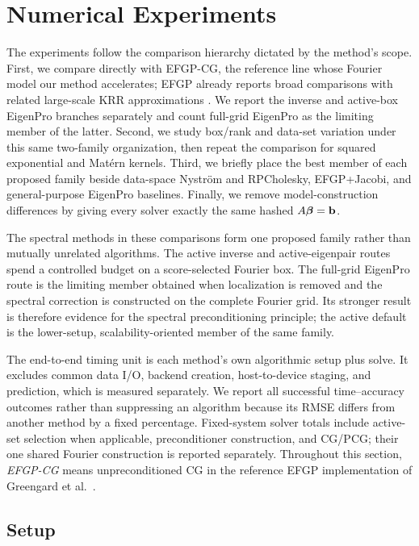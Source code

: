 \section{Numerical Experiments}
\label{sec:experiments}

The experiments follow the comparison hierarchy dictated by the method's
scope.  First, we compare directly with EFGP-CG, the reference line whose
Fourier model our method accelerates; EFGP already reports broad comparisons
with related large-scale KRR approximations \cite{greengard2025efgp}.  We
report the inverse and active-box EigenPro branches separately and count
full-grid EigenPro as the limiting member of the latter.  Second, we study
box/rank and data-set variation under this same two-family organization, then
repeat the comparison for squared exponential and Mat\'ern kernels.  Third,
we briefly place the best member of each proposed family beside data-space
Nystr\"om and RPCholesky, EFGP+Jacobi, and general-purpose EigenPro baselines.
Finally, we remove model-construction differences by giving every solver
exactly the same hashed \(A\boldsymbol\beta=\mathbf b\).

The spectral methods in these comparisons form one proposed family rather
than mutually unrelated algorithms.  The active inverse and active-eigenpair
routes spend a controlled budget on a score-selected Fourier box.  The
full-grid EigenPro route is the limiting member obtained when localization is
removed and the spectral correction is constructed on the complete Fourier
grid.  Its stronger result is therefore evidence for the spectral
preconditioning principle; the active default is the lower-setup,
scalability-oriented member of the same family.

The end-to-end timing unit is each method's own algorithmic setup plus solve.
It excludes common data I/O, backend creation, host-to-device staging, and
prediction, which is measured separately.  We report all successful
time--accuracy outcomes rather than suppressing an algorithm because its RMSE
differs from another method by a fixed percentage.  Fixed-system solver totals
include active-set selection when applicable, preconditioner construction,
and CG/PCG; their one shared Fourier construction is reported separately.
Throughout this section, \emph{EFGP-CG} means unpreconditioned CG in the
reference EFGP implementation of Greengard et al.\
\cite{greengard2025efgp}.

\subsection{Setup}
\label{subsec:exp-setup}

